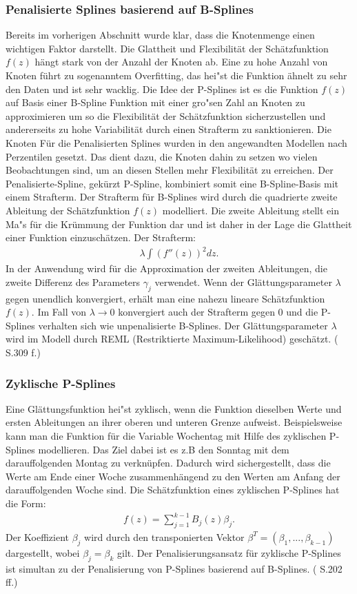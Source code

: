 \documentclass[12pt]{scrreprt}
\begin{document}
\subsubsection{Penalisierte Splines basierend auf B-Splines}
Bereits im vorherigen Abschnitt wurde klar, dass die Knotenmenge einen wichtigen Faktor darstellt. Die Glattheit und Flexibilität der Schätzfunktion $f(z)$ hängt stark von der Anzahl der Knoten ab. Eine zu hohe Anzahl von Knoten führt zu sogenanntem \glqq Overfitting\grqq, das hei"st die Funktion ähnelt zu sehr den Daten und ist sehr wacklig. Die Idee der P-Splines ist es die Funktion $f(z)$ auf Basis einer B-Spline Funktion mit einer gro"sen Zahl an Knoten zu approximieren um so die Flexibilität der Schätzfunktion sicherzustellen und andererseits zu hohe Variabilität durch einen Strafterm zu sanktionieren. Die Knoten Für die Penalisierten Splines wurden in den angewandten Modellen nach Perzentilen gesetzt. Das dient dazu, die Knoten dahin zu setzen wo vielen Beobachtungen sind, um an diesen Stellen mehr Flexibilität zu erreichen. Der Penalisierte-Spline, gekürzt P-Spline, kombiniert somit eine B-Spline-Basis mit einem Strafterm. Der Strafterm für B-Splines wird durch die quadrierte zweite Ableitung der Schätzfunktion $f(z)$ modelliert. Die zweite Ableitung stellt ein Ma"s für die Krümmung der Funktion dar und ist daher in der Lage die Glattheit einer Funktion einzuschätzen.
Der Strafterm: 
\begin{align}
\lambda\int(f''(z))^2dz.
\end{align}
In der Anwendung wird für die Approximation der zweiten Ableitungen, die zweite Differenz des Parameters $\gamma_{j}$ verwendet. Wenn der Glättungsparameter $\lambda$ gegen unendlich konvergiert, erhält man eine nahezu lineare Schätzfunktion $f(z)$. Im Fall von $\lambda \to 0$ konvergiert auch der Strafterm gegen $0$ und die P-Splines verhalten sich wie unpenalisierte B-Splines. Der Glättungsparameter $\lambda$ wird im Modell durch REML (Restriktierte Maximum-Likelihood) geschätzt. (\cite{fahrmeir2007regression} S.309 f.)

\subsubsection{Zyklische P-Splines}
Eine Glättungsfunktion hei"st zyklisch, wenn die Funktion dieselben Werte und ersten Ableitungen an ihrer oberen und unteren Grenze aufweist. Beispielsweise kann man die Funktion für die Variable Wochentag mit Hilfe des zyklischen P-Splines modellieren. Das Ziel dabei ist es z.B den Sonntag mit dem darauffolgenden Montag zu verknüpfen. Dadurch wird sichergestellt, dass die Werte am Ende einer Woche zusammenhängend zu den Werten am Anfang der darauffolgenden Woche sind. 
Die Schätzfunktion eines zyklischen P-Splines hat die Form:
\begin{align}
f(z)=\sum_{j=1}^{k-1}B_{j}(z)\beta_{j}.
\end{align}
Der Koeffizient $\beta_{j}$ wird durch den transponierten Vektor $\beta^T=(\beta_{1},...,\beta_{k-1})$ dargestellt, wobei $\beta_{j}=\beta_{k}$ gilt.
Der Penalisierungsansatz für zyklische P-Splines ist simultan zu der Penalisierung von P-Splines basierend auf B-Splines. (\cite{wood2017generalized} S.202 ff.)
\end{document}
